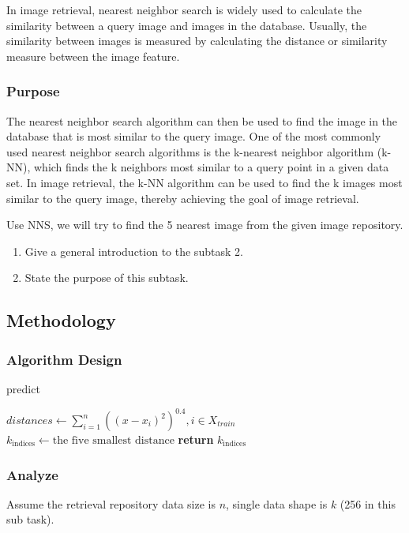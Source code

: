 \documentclass{article}
\begin{document}
In image retrieval, nearest neighbor search is widely used to calculate the similarity between a query image and images in the database. Usually, the similarity between images is measured by calculating the distance or similarity measure between the image feature.

\subsubsection{Purpose}
The nearest neighbor search algorithm can then be used to find the image in the database that is most similar to the query image. One of the most commonly used nearest neighbor search algorithms is the k-nearest neighbor algorithm (k-NN), which finds the k neighbors most similar to a query point in a given data set. In image retrieval, the k-NN algorithm can be used to find the k images most similar to the query image, thereby achieving the goal of image retrieval.

Use NNS, we will try to find the 5 nearest image from the given image repository.

\begin{enumerate}
\item Give a general introduction to the subtask 2.
\item State the purpose of this subtask.
\end{enumerate}

\subsection{Methodology}
\subsubsection{Algorithm Design}

\begin{algorithm}
\caption{predict}
\begin{algorithmic}[1]
    \State $distances \gets \sum_{i=1}^{n}((x - x_i)^2)^{0.4}, i \in X_{train}$
    \State {}
    \State $k_{\text{indices}} \gets \text{the five smallest distance}$
    \State \textbf{return} $k_{\text{indices}}$
\EndFunction
\end{algorithmic}
\end{algorithm}

\subsubsection{Analyze}
Assume the retrieval repository data size is $n$, single data shape is $k$ (256 in this sub task). 
\end{document}

